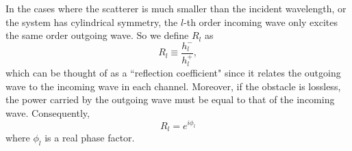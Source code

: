 \documentclass[preprint,aps]{revtex4}
\begin{document}
In the cases where the scatterer is much smaller than the incident
wavelength, or the system has cylindrical symmetry, the $l$-th order
incoming wave only excites the same order outgoing wave. So we
define $R_l$ as
\begin{equation}
\label{eq:Rl} {R_l} \equiv \frac{{h_l^ - }}{{h_l^ + }},
\end{equation}
which can be thought of as a ``reflection coefficient" since it
relates the outgoing wave to the incoming wave in each channel.
Moreover, if the obstacle is lossless, the power carried by the
outgoing wave must be equal to that of the incoming wave.
Consequently,
\begin{equation} \label{eq:Rl} {R_l}  = {e^{i\phi_l }}
\end{equation}
where $\phi_l$ is a real phase factor.
\end{document}
